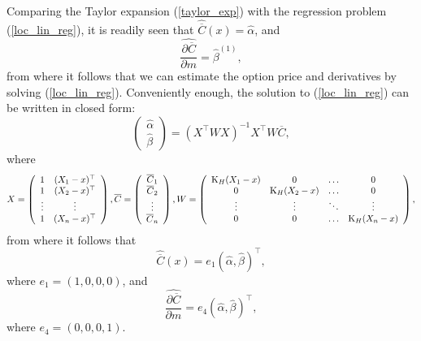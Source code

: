 \documentclass[a4paper,12pt]{article}
\theoremstyle{plain}
\theoremstyle{definition}
\begin{document}
Comparing the Taylor expansion (\ref{taylor_exp}) with the regression problem (\ref{loc_lin_reg}), it is readily seen that $\widehat{\overline{C}}(x) = \widehat{\alpha}$, and
\begin{equation}
\widehat{\frac{ \partial \overline{C} }{\partial m}} = \widehat{\beta}^{(1)},
\end{equation}
from where it follows that we can estimate the option price and derivatives by solving (\ref{loc_lin_reg}). Conveniently enough, the solution to (\ref{loc_lin_reg}) can be written in closed form:
\begin{equation}
\left(\begin{array}{c}
\widehat{\alpha}\\
\widehat{\beta}
\end{array} \right) = \left( X^{\top} W X \right)^{-1} X^{\top} W \overline{C},
\end{equation}
where
\begin{equation}
X = 	\left(\begin{array}{cc}
	   1 & (X_1 - x)^{\top}\\
	   1 & (X_2 - x)^{\top}\\
	   \vdots & \vdots\\
	   1 & (X_n - x)^{\top}
	   \end{array} \right), \vspace{3mm}
\overline{C} = 	\left(\begin{array}{c}
	   \overline{C}_1 \\
	   \overline{C}_2 \\
	   \vdots \\
	   \overline{C}_n
	   \end{array} \right), \vspace{3mm}
W = 	\left(\begin{array}{cccc}
	   \operatorname{K}_H(X_1 - x) & 0 & \dots & 0 \\
	   0 & \operatorname{K}_H(X_2 - x) & \dots & 0 \\
	   \vdots & \vdots & \ddots & \vdots \\
	   0 & 0 & \dots & \operatorname{K}_H(X_n - x)
	   \end{array} \right),
\end{equation}
from where it follows that
\begin{equation}
\widehat{\overline{C}}(x) = e_1 (\widehat{\alpha}, \widehat{\beta})^{\top},
\end{equation}
where $e_1 = (1, 0, 0, 0)$, and
\begin{equation}
\widehat{\frac{ \partial \overline{C} }{\partial m}} = e_4 (\widehat{\alpha}, \widehat{\beta})^{\top},
\end{equation}
where $e_4 = (0, 0, 0, 1)$.
\end{document}
